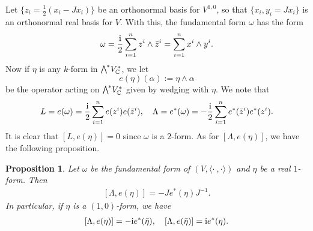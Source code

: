 \documentclass[11pt]{book}
\newtheorem{proposition}[theorem]{Proposition}
\theoremstyle{definition}
\begin{document}
Let $\{z_i=\frac{1}{2}(x_i-Jx_i)\}$ be an orthonormal basis for $V^{1,0}$, so that $\{x_i,y_i=Jx_i\}$ is an orthonormal real basis for $V$. With this, the fundamental form $\omega$ has the form
\[\omega=\frac{\mathrm{i}}{2}\sum_{i=1}^{n}z^i\wedge\bar{z}^i=\sum_{i=1}^{n}x^i\wedge y^i.\]
Now if $\eta$ is any $k$-form in $\bigw^*V^*_{\C}$, we let
\[e(\eta)(\alpha):=\eta\wedge\alpha\]
be the operator acting on $\bigw^*V^*_{\C}$ given by wedging with $\eta$. We note that
\begin{align}\label{almost complex space interoir prod into L,Lambda}
L=e(\omega)=\frac{\mathrm{i}}{2}\sum_{i=1}^{n}e(z^i)e(\bar{z}^i),\quad \Lambda=e^*(\omega)=-\frac{\mathrm{i}}{2}\sum_{i=1}^{n}e^*(\bar{z}^i)e^*(z^i).
\end{align}
It is clear that $[L,e(\eta)]=0$ since $\omega$ is a $2$-form. As for $[\Lambda,e(\eta)]$, we have the following proposition.
\begin{proposition}\label{almost complex space interoir prod commutator with L,Lambda}
Let $\omega$ be the fundamental form of $(V,\langle\cdot\ ,\cdot\rangle)$ and $\eta$ be a real $1$-form. Then
\begin{align}\label{almost complex space interoir prod commutator with L,Lambda-2}
[\Lambda,e(\eta)]=-Je^*(\eta)J^{-1}.
\end{align}
In particular, if $\eta$ is a $(1,0)$-form, we have
\begin{align}\label{almost complex space interoir prod commutator with L,Lambda-1}
[\Lambda,e(\eta)]=-\mathrm{i} e^*(\bar{\eta}),\quad [\Lambda,e(\bar{\eta})]=\mathrm{i} e^*(\eta).
\end{align}
\end{proposition}
\end{document}
